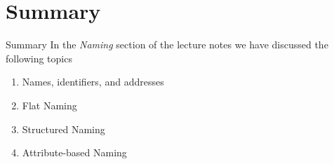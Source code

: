 \section{Summary}
\begin{slide}{Summary}
In the \emph{Naming} section of the lecture notes
we have discussed the following topics
\begin{enumerate}
  \item Names, identifiers, and addresses
  \item Flat Naming
  \item Structured Naming
  \item Attribute-based Naming
\end{enumerate}
\end{slide}
